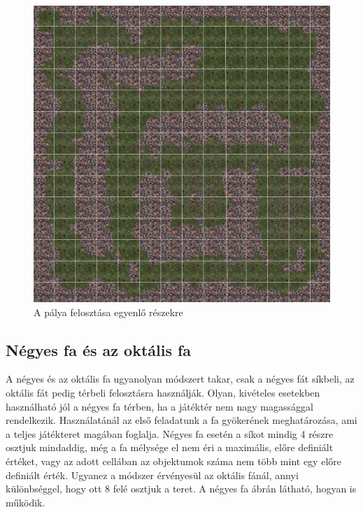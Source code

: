 \begin{figure}[h]
\centering
\includegraphics[scale=0.22]{kepek/grid.png}
\caption{A pálya felosztása egyenlő részekre}
\label{fig:grid}
\end{figure}

\subsection{Négyes fa és az oktális fa}

A négyes és az oktális fa ugyanolyan módszert takar, csak a négyes fát síkbeli, az oktális fát pedig térbeli felosztásra használják. Olyan, kivételes esetekben használható jól a négyes fa térben, ha a játéktér nem nagy magassággal rendelkezik. Használatánál az első feladatunk a fa gyökerének meghatározása, ami a teljes játékteret magában foglalja. Négyes fa esetén a síkot mindig 4 részre osztjuk mindaddig, még a fa mélysége el nem éri a maximális, előre definiált értéket, vagy az adott cellában az objektumok száma nem több mint egy előre definiált érték. Ugyanez a módszer érvényesül az oktális fánál, annyi különbséggel, hogy ott 8 felé osztjuk a teret. A négyes fa  ábrán látható, hogyan is működik.

